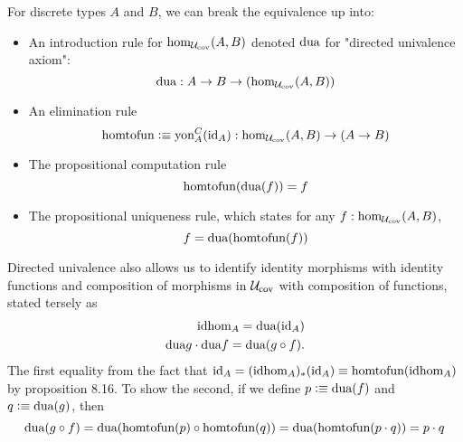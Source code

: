 \documentclass[main.tex]{subfiles}
\begin{document}
For discrete types $A$ and $B$, we can break the equivalence up into:
\begin{itemize}
    \item An introduction rule for $\ho[\uc]{A}{B}$ denoted $\dua$ for "directed univalence axiom":
    $$\dua : A \to B \to (\ho[\uc]{A}{B})$$
    \item An elimination rule
    $$\htf \defeq \yon{C}{A}(\id{A}) : \ho[\uc]{A}{B} \to (A \to B)$$
    \item The propositional computation rule
        $$\htf(\dua(f)) = f$$
    \item The propositional uniqueness rule, which states for any $f : \ho[\uc]{A} {B}$,
    $$f = \dua(\htf(f))$$
\end{itemize}
Directed univalence also allows us to  identify identity morphisms with identity functions and composition of morphisms in $\uc$ with composition of functions, stated tersely as
\begin{align*}
    \idhom{A} = \dua(\id{A})\\
    \dua{g}\cdot\dua{f} = \dua(g \circ f).
\end{align*}
The first equality from the fact that $\id{A} = (\idhom{A})_*(\id{A}) \equiv \htf(\idhom{A})$ by proposition 8.16. To show the second, if we define $p \defeq \dua(f)$ and $q \defeq \dua(g)$, then
    $$\dua(g \circ f) = \dua(\htf(p) \circ \htf(q)) = \dua(\htf(p \cdot q)) = p \cdot q$$
\end{document}
